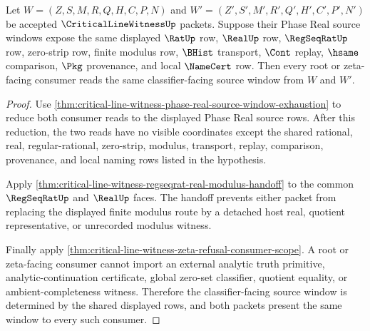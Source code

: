 \begin{theorem}
\label{thm:critical-line-witness-phase-real-classifier-determinacy}
Let $W=(Z,S,M,R,Q,H,C,P,N)$ and $W'=(Z',S',M',R',Q',H',C',P',N')$ be accepted $\CriticalLineWitnessUp$ packets. Suppose their Phase Real source windows expose the same displayed $\RatUp$ row, $\RealUp$ row, $\RegSeqRatUp$ row, zero-strip row, finite modulus row, $\BHist$ transport, $\Cont$ replay, $\hsame$ comparison, $\Pkg$ provenance, and local $\NameCert$ row. Then every root or zeta-facing consumer reads the same classifier-facing source window from $W$ and $W'$.
\end{theorem}
\begin{proof}
Use \autoref{thm:critical-line-witness-phase-real-source-window-exhaustion} to reduce both consumer reads to the displayed Phase Real source rows. After this reduction, the two reads have no visible coordinates except the shared rational, real, regular-rational, zero-strip, modulus, transport, replay, comparison, provenance, and local naming rows listed in the hypothesis.

Apply \autoref{thm:critical-line-witness-regseqrat-real-modulus-handoff} to the common $\RegSeqRatUp$ and $\RealUp$ faces. The handoff prevents either packet from replacing the displayed finite modulus route by a detached host real, quotient representative, or unrecorded modulus witness.

Finally apply \autoref{thm:critical-line-witness-zeta-refusal-consumer-scope}. A root or zeta-facing consumer cannot import an external analytic truth primitive, analytic-continuation certificate, global zero-set classifier, quotient equality, or ambient-completeness witness. Therefore the classifier-facing source window is determined by the shared displayed rows, and both packets present the same window to every such consumer.
\end{proof}

